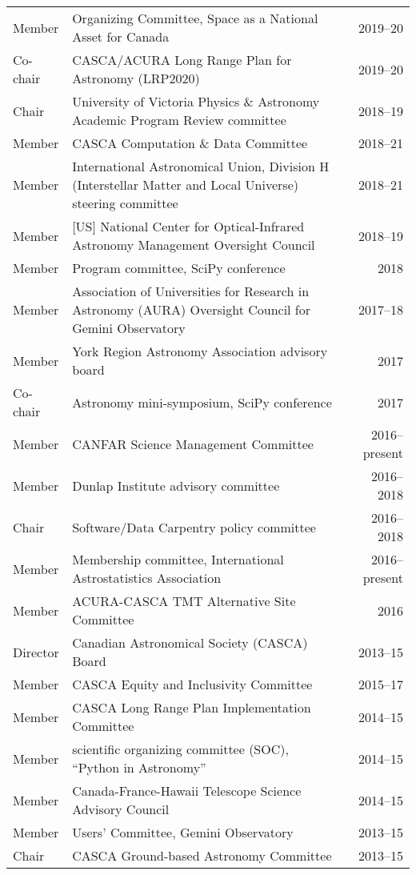 \begin{tabularx}{\textwidth}{lXr}
Member & Organizing Committee, Space as a National Asset for Canada & 2019--20\\ 
Co-chair & CASCA/ACURA Long Range Plan for Astronomy (LRP2020) & 2019--20\\
Chair & University of Victoria Physics \& Astronomy Academic Program Review committee& 2018--19\\
Member & CASCA Computation \& Data Committee& 2018--21 \\
Member & International Astronomical Union, Division H (Interstellar Matter and Local Universe) steering committee& 2018--21 \\
Member& [US] National Center for Optical-Infrared Astronomy Management Oversight Council & 2018--19 \\
Member & Program committee, SciPy conference & 2018\\
Member & Association of Universities for Research in Astronomy (AURA) Oversight Council for Gemini Observatory & 2017--18\\
Member & York Region Astronomy Association advisory board & 2017\\
Co-chair & Astronomy mini-symposium, SciPy conference & 2017\\
Member & CANFAR Science Management Committee & 2016--present\\
Member & Dunlap Institute advisory committee & 2016--2018\\
Chair & Software/Data Carpentry policy committee & 2016--2018\\
Member & Membership committee, International Astrostatistics Association & 2016--present\\
Member & ACURA-CASCA TMT Alternative Site Committee & 2016\\
Director& Canadian Astronomical Society (CASCA) Board& 2013--15\\
Member& CASCA Equity and Inclusivity Committee& 2015--17\\
Member& CASCA Long Range Plan Implementation Committee& 2014--15\\
Member& scientific organizing committee (SOC), ``Python in Astronomy'' & 2014--15\\
Member& Canada-France-Hawaii Telescope Science Advisory Council& 2014--15\\
Member&  Users' Committee, Gemini Observatory& 2013--15\\
Chair& CASCA Ground-based Astronomy Committee& 2013--15\\

\end{tabularx}
